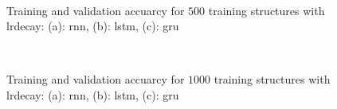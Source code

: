 \documentclass[conference]{IEEEtran}
\begin{document}
\begin{figure}[htp]
	\centering
	\quad
	\\
	\caption{Training and validation accuarcy for $ 500 $ training structures with \gls{lrdecay}: (a): \gls{rnn}, (b): \gls{lstm}, (c): \gls{gru}}
	\label{fig:accuracy_500_structures_fine_tuning_rnn}
\end{figure}

\begin{figure}[htp]
	\centering
	\quad
	\\
	\caption{Training and validation accuarcy for $ 1000 $ training structures with \gls{lrdecay}: (a): \gls{rnn}, (b): \gls{lstm}, (c): \gls{gru}}
	\label{fig:accuracy_1000_structures_fine_tuning_rnn}
\end{figure}
\end{document}

